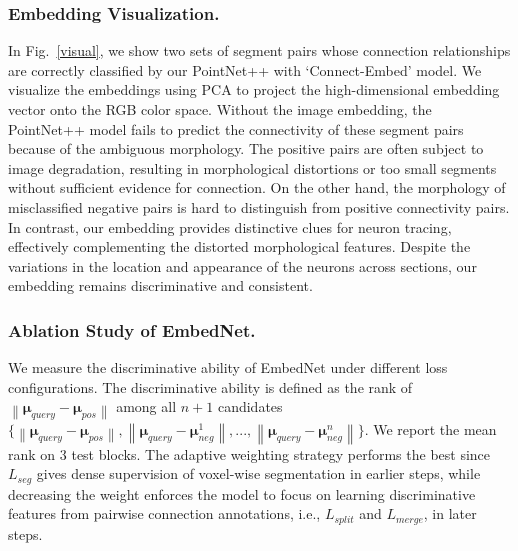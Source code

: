 \subsubsection{Embedding Visualization.}
 In Fig.~\ref{visual}, we show two sets of segment pairs whose connection relationships are correctly classified by our PointNet++ with `Connect-Embed' model. 
We visualize the embeddings using PCA to project the high-dimensional embedding vector onto the RGB color space. 
Without the image embedding, the PointNet++ model fails to predict the connectivity of these segment pairs because of the ambiguous morphology. The positive pairs are often subject to image degradation, resulting in morphological distortions or too small segments without sufficient evidence for connection. 
On the other hand, the morphology of misclassified negative pairs is hard to distinguish from positive connectivity pairs. 
In contrast, our embedding provides distinctive clues for neuron tracing, effectively complementing the distorted morphological features. Despite the variations in the location and appearance of the neurons across sections, our embedding remains discriminative and consistent. 

\subsubsection{Ablation Study of EmbedNet.}
We measure the discriminative ability of EmbedNet under different loss configurations. The discriminative ability is defined as the rank of $\left\|\bm{\mu}_{query}\!-\!\bm{\mu}_{pos}\right\|$ among all $n+1$ candidates $\{\!\left\|\bm{\mu}_{query}\!-\!\bm{\mu}_{pos}\right\|\!,\left\|\bm{\mu}_{query}\!-\!\bm{\mu}_{neg}^1\right\|\!,...,\left\|\bm{\mu}_{query}\!-\!\bm{\mu}_{neg}^n\right\|\!\}$. 
We report the mean rank on $3$ test blocks. The adaptive weighting strategy performs the best since $L_{seg}$ gives dense supervision of voxel-wise segmentation in earlier steps, while decreasing the weight enforces the model to focus on learning discriminative features from pairwise connection annotations, i.e., $L_{split}$ and $L_{merge}$, in later steps.



